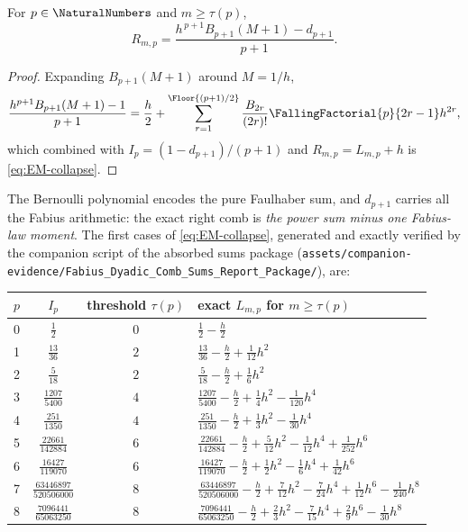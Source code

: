 \begin{corollary}
\label{thm:F-stabilization}
For $p\in\NaturalNumbers$ and $m\ge\tau(p)$,
\begin{equation}
 \boxed{\;
 R_{m,p}
 =\frac{h^{\,p+1}B_{p+1}(M+1)-d_{p+1}}{p+1}.
 \;}
 \label{eq:F-stabilized-Bernoulli}
\end{equation}
\end{corollary}

\begin{proof}
Expanding $B_{p+1}(M+1)$ around $M=1/h$,
\[
 \frac{h^{p+1}B_{p+1}(M+1)-1}{p+1}
 =\frac h2+\sum_{r=1}^{\Floor{(p+1)/2}}
 \frac{B_{2r}}{(2r)!}\FallingFactorial{p}{2r-1}h^{2r},
\]
which combined with $I_p=(1-d_{p+1})/(p+1)$ and
$R_{m,p}=L_{m,p}+h$ is \eqref{eq:EM-collapse}.
\end{proof}

The Bernoulli polynomial encodes the pure Faulhaber sum, and
$d_{p+1}$ carries all the Fabius arithmetic: the exact right comb is
\emph{the power sum minus one Fabius-law moment}.  The first cases of
\eqref{eq:EM-collapse}, generated and exactly verified by the
companion script of the absorbed sums package
(\nolinkurl{assets/companion-evidence/Fabius_Dyadic_Comb_Sums_Report_Package/}), are:

\begin{center}
\small
\begin{tabular}{c c c l}
\toprule
$p$ & $I_p$ & threshold $\tau(p)$ & exact $L_{m,p}$ for $m\ge\tau(p)$ \\
\midrule
0 & $\frac{1}{2}$ & $0$ & $\frac{1}{2}-\frac{h}{2}$ \\
1 & $\frac{13}{36}$ & $2$ & $\frac{13}{36}-\frac{h}{2}+\frac{1}{12}h^{2}$ \\
2 & $\frac{5}{18}$ & $2$ & $\frac{5}{18}-\frac{h}{2}+\frac{1}{6}h^{2}$ \\
3 & $\frac{1207}{5400}$ & $4$ & $\frac{1207}{5400}-\frac{h}{2}+\frac{1}{4}h^{2}-\frac{1}{120}h^{4}$ \\
4 & $\frac{251}{1350}$ & $4$ & $\frac{251}{1350}-\frac{h}{2}+\frac{1}{3}h^{2}-\frac{1}{30}h^{4}$ \\
5 & $\frac{22661}{142884}$ & $6$ & $\frac{22661}{142884}-\frac{h}{2}+\frac{5}{12}h^{2}-\frac{1}{12}h^{4}+\frac{1}{252}h^{6}$ \\
6 & $\frac{16427}{119070}$ & $6$ & $\frac{16427}{119070}-\frac{h}{2}+\frac{1}{2}h^{2}-\frac{1}{6}h^{4}+\frac{1}{42}h^{6}$ \\
7 & $\frac{63446897}{520506000}$ & $8$ & $\frac{63446897}{520506000}-\frac{h}{2}+\frac{7}{12}h^{2}-\frac{7}{24}h^{4}+\frac{1}{12}h^{6}-\frac{1}{240}h^{8}$ \\
8 & $\frac{7096441}{65063250}$ & $8$ & $\frac{7096441}{65063250}-\frac{h}{2}+\frac{2}{3}h^{2}-\frac{7}{15}h^{4}+\frac{2}{9}h^{6}-\frac{1}{30}h^{8}$ \\
\bottomrule
\end{tabular}
\label{tab:integer-closed}
\end{center}

